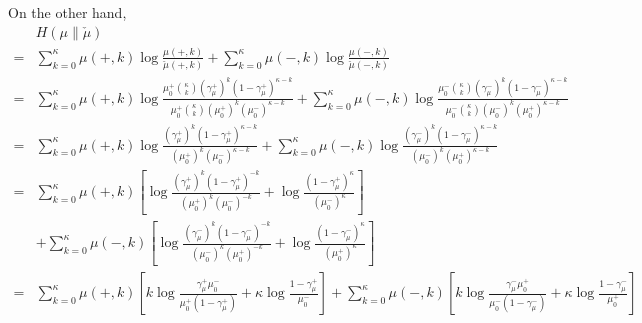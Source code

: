 \documentclass[12pt]{article}
\begin{document}
On the other hand,
\begin{align*}
      & H(\mu \| \check{\mu})                                                                                   \\
    = & \sum_{k=0}^\kappa \mu(+, k)\log\frac{\mu(+, k)}{\check{\mu}(+, k)}
    + \sum_{k=0}^\kappa \mu(-, k)\log\frac{\mu(-, k)}{\check{\mu}(-, k)}                                        \\
    = & \sum_{k=0}^\kappa \mu(+, k)\log\frac{
    \mu_0^+{\kappa \choose k}\left(\gamma_\mu^+\right)^k\left(1 - \gamma_\mu^+\right)^{\kappa - k}
    }{
    \mu_0^+{\kappa \choose k}\left(\mu_0^+\right)^k\left(\mu_0^-\right)^{\kappa - k}}
    + \sum_{k=0}^\kappa \mu(-, k)\log\frac{
    \mu_0^-{\kappa \choose k}\left(\gamma_\mu^-\right)^k\left(1 - \gamma_\mu^-\right)^{\kappa - k}
    }{
    \mu_0^-{\kappa \choose k}\left(\mu_0^-\right)^k\left(\mu_0^+\right)^{\kappa - k}}                           \\
    = & \sum_{k=0}^\kappa \mu(+, k)\log\frac{
        \left(\gamma_\mu^+\right)^k\left(1 - \gamma_\mu^+\right)^{\kappa - k}
    }{
        \left(\mu_0^+\right)^k\left(\mu_0^-\right)^{\kappa - k}}
    + \sum_{k=0}^\kappa \mu(-, k)\log\frac{
        \left(\gamma_\mu^-\right)^k\left(1 - \gamma_\mu^-\right)^{\kappa - k}
    }{
    \left(\mu_0^-\right)^k\left(\mu_0^+\right)^{\kappa - k}}                                                    \\
    = & \sum_{k=0}^\kappa \mu(+, k)\left[\log\frac{
            \left(\gamma_\mu^+\right)^k\left(1 - \gamma_\mu^+\right)^{-k}
        }{
            \left(\mu_0^+\right)^k\left(\mu_0^-\right)^{-k}}
    + \log \frac{\left(1 - \gamma_\mu^+\right)^\kappa}{\left(\mu_0^-\right)^\kappa}\right]                      \\
      & + \sum_{k=0}^\kappa \mu(-, k)\left[\log\frac{
            \left(\gamma_\mu^-\right)^k\left(1 - \gamma_\mu^-\right)^{-k}
        }{
            \left(\mu_0^-\right)^k\left(\mu_0^+\right)^{-k}}
    + \log\frac{\left(1 - \gamma_\mu^-\right)^\kappa}{\left(\mu_0^+\right)^\kappa}\right]                       \\
    = & \sum_{k=0}^\kappa \mu(+, k)\left[k\log\frac{\gamma_\mu^+ \mu_0^-}{\mu_0^+\left(1 - \gamma_\mu^+\right)}
        + \kappa\log\frac{1 - \gamma_\mu^+}{\mu_0^-}\right]
    + \sum_{k=0}^\kappa \mu(-, k)\left[k\log\frac{\gamma_\mu^- \mu_0^+}{\mu_0^-\left(1 - \gamma_\mu^-\right)}
    + \kappa\log\frac{1 - \gamma_\mu^-}{\mu_0^+}\right]                                                         \\

\end{align*}
\end{document}
